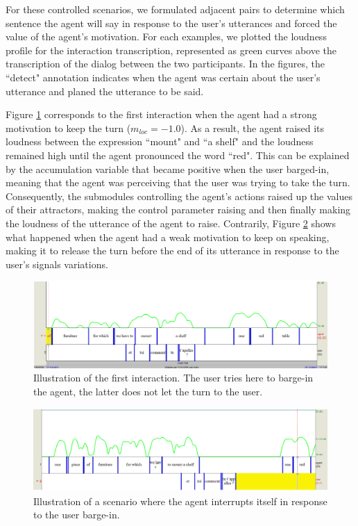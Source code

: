 For these controlled scenarios, we formulated adjacent pairs to determine which sentence the agent will say in response to the user's utterances and forced the value of the agent's motivation. 
For each examples, we plotted the loudness profile for the interaction transcription, represented as green curves above the transcription of the dialog between the two participants. In the figures, the ``detect" annotation indicates when the agent was certain about the user's utterance and planed the utterance to be said. 

Figure \ref{sc_1} corresponds to the first interaction when the agent had a strong motivation to keep the turn ($m_{loc}=-1.0$). 
As a result, the agent raised its loudness between the expression ``mount" and ``a shelf" and the loudness remained high until the agent pronounced the word ``red". This can be explained by the accumulation variable that became positive when the user barged-in, meaning that the agent was perceiving that the user was trying to take the turn. 
Consequently, the submodules controlling the agent's actions raised up the values of their attractors, making the control parameter raising and then finally making the loudness of the utterance of the agent to raise. 
Contrarily, Figure \ref{sc_2} shows what happened when the agent had a weak motivation to keep on speaking, making it to release the turn before the end of its utterance in response to the user's signals variations.

\begin{figure}
  \centering
  \includegraphics[width=\linewidth]{figure/volume_transcript_1_1.png}
  \caption{Illustration of the first interaction. The user tries here to barge-in the agent, the latter does not let the turn to the user.}
  \label{sc_1}
\end{figure}

\begin{figure}
\centering
\includegraphics[width=\linewidth]{figure/volume_transcript_1_2.png}
\caption{Illustration of a scenario where the agent interrupts itself in response to the user barge-in.}
\label{sc_2}
\end{figure}


